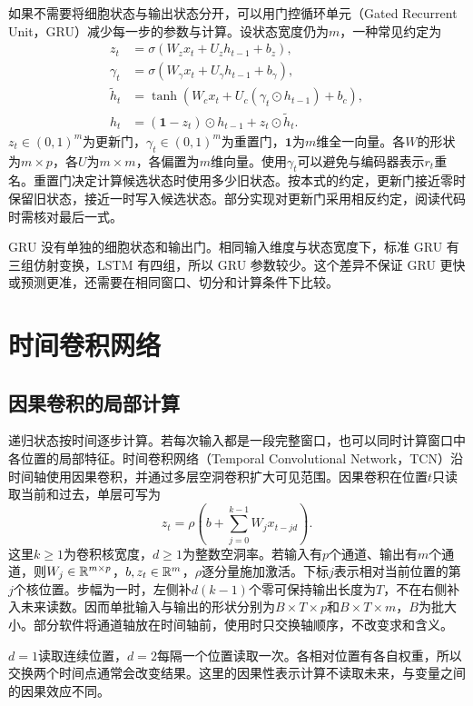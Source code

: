 如果不需要将细胞状态与输出状态分开，可以用门控循环单元（Gated Recurrent Unit，GRU）减少每一步的参数与计算。设状态宽度仍为$m$，一种常见约定为
\begin{align}
 z_t&=\sigma(W_zx_t+U_zh_{t-1}+b_z),\\
 \gamma_t&=\sigma(W_\gamma x_t+U_\gamma h_{t-1}+b_\gamma),\\
 \tilde h_t&=\tanh(W_cx_t+U_c(\gamma_t\odot h_{t-1})+b_c),\\
 h_t&=(\mathbf1-z_t)\odot h_{t-1}+z_t\odot\tilde h_t.
\end{align}
$z_t\in(0,1)^m$为更新门，$\gamma_t\in(0,1)^m$为重置门，$\mathbf1$为$m$维全一向量。各$W$的形状为$m\times p$，各$U$为$m\times m$，各偏置为$m$维向量。使用$\gamma_t$可以避免与编码器表示$r_t$重名。重置门决定计算候选状态时使用多少旧状态。按本式的约定，更新门接近零时保留旧状态，接近一时写入候选状态。部分实现对更新门采用相反约定，阅读代码时需核对最后一式。

GRU 没有单独的细胞状态和输出门。相同输入维度与状态宽度下，标准 GRU 有三组仿射变换，LSTM 有四组，所以 GRU 参数较少。这个差异不保证 GRU 更快或预测更准，还需要在相同窗口、切分和计算条件下比较。

\section{时间卷积网络}
\subsection{因果卷积的局部计算}
递归状态按时间逐步计算。若每次输入都是一段完整窗口，也可以同时计算窗口中各位置的局部特征。时间卷积网络（Temporal Convolutional Network，TCN）沿时间轴使用因果卷积，并通过多层空洞卷积扩大可见范围。因果卷积在位置$t$只读取当前和过去，单层可写为
\begin{equation}
 z_t=\rho\left(b+\sum_{j=0}^{k-1}W_jx_{t-jd}\right).
 \label{eq:sequence-tcn}
\end{equation}
这里$k\geq1$为卷积核宽度，$d\geq1$为整数空洞率。若输入有$p$个通道、输出有$m$个通道，则$W_j\in\mathbb{R}^{m\times p}$，$b,z_t\in\mathbb{R}^m$，$\rho$逐分量施加激活。下标$j$表示相对当前位置的第$j$个核位置。步幅为一时，左侧补$d(k-1)$个零可保持输出长度为$T$，不在右侧补入未来读数。因而单批输入与输出的形状分别为$B\times T\times p$和$B\times T\times m$，$B$为批大小。部分软件将通道轴放在时间轴前，使用时只交换轴顺序，不改变求和含义。

$d=1$读取连续位置，$d=2$每隔一个位置读取一次。各相对位置有各自权重，所以交换两个时间点通常会改变结果。这里的因果性表示计算不读取未来，与变量之间的因果效应不同。

